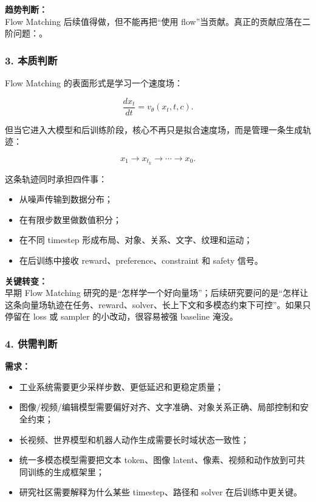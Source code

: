 \begin{summarybox}
\textbf{趋势判断：}\\
Flow Matching 后续值得做，但不能再把“使用 flow”当贡献。真正的贡献应落在二阶问题：。
\end{summarybox}

\subsubsection*{3. 本质判断}

Flow Matching 的表面形式是学习一个速度场：

\[
\frac{dx_t}{dt} = v_\theta(x_t,t,c).
\]

但当它进入大模型和后训练阶段，核心不再只是拟合速度场，而是管理一条生成轨迹：

\[
x_1 \rightarrow x_{t_k} \rightarrow \cdots \rightarrow x_0.
\]

这条轨迹同时承担四件事：

\begin{itemize}[leftmargin=1.5em]
  \item 从噪声传输到数据分布；
  \item 在有限步数里做数值积分；
  \item 在不同 timestep 形成布局、对象、关系、文字、纹理和运动；
  \item 在后训练中接收 reward、preference、constraint 和 safety 信号。
\end{itemize}

\begin{warnbox}
\textbf{关键转变：}\\
早期 Flow Matching 研究的是“怎样学一个好向量场”；后续研究要问的是“怎样让这条向量场轨迹在任务、reward、solver、长上下文和多模态约束下可控”。如果只停留在 loss 或 sampler 的小改动，很容易被强 baseline 淹没。
\end{warnbox}

\subsubsection*{4. 供需判断}

\textbf{需求：}

\begin{itemize}[leftmargin=1.5em]
  \item 工业系统需要更少采样步数、更低延迟和更稳定质量；
  \item 图像/视频/编辑模型需要偏好对齐、文字准确、对象关系正确、局部控制和安全约束；
  \item 长视频、世界模型和机器人动作生成需要长时域状态一致性；
  \item 统一多模态模型需要把文本 token、图像 latent、像素、视频和动作放到可共同训练的生成框架里；
  \item 研究社区需要解释为什么某些 timestep、路径和 solver 在后训练中更关键。
\end{itemize}

